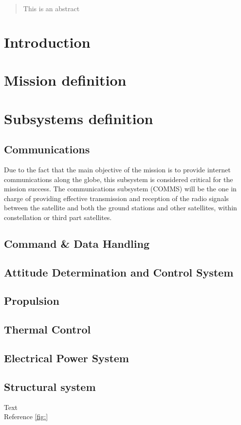 \begin{abstract}
This is an abstract
\end{abstract}

\section{Introduction}

\section{Mission definition}

\section{Subsystems definition}

\subsection{Communications}
Due to the fact that the main objective of the mission is to provide internet
communications along the globe, this subsystem is considered critical for the
mission success. The communications subsystem (COMMS) will be the one in charge
of providing effective transmission and reception of the radio signals between the
satellite and both the ground stations and other satellites, within \MissionName
constellation or third part satellites.

\subsection{Command \& Data Handling}

\subsection{Attitude Determination and Control System}

\subsection{Propulsion}

\subsection{Thermal Control}

\subsection{Electrical Power System}

\subsection{Structural system}



Text\\

Reference \ref{fig:}\\
